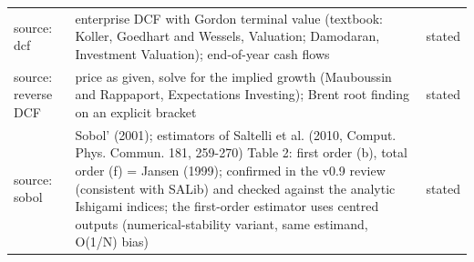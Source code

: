 \begin{table}[H]
\begin{tabular}{>{\raggedright\arraybackslash}p{3.0cm}>{\raggedright\arraybackslash}p{10.6cm}>{\raggedright\arraybackslash}p{2.1cm}}
source: dcf & enterprise DCF with Gordon terminal value (textbook: Koller, Goedhart and Wessels, Valuation; Damodaran, Investment Valuation); end-of-year cash flows & stated \\
source: reverse DCF & price as given, solve for the implied growth (Mauboussin and Rappaport, Expectations Investing); Brent root finding on an explicit bracket & stated \\
source: sobol & Sobol' (2001); estimators of Saltelli et al. (2010, Comput. Phys. Commun. 181, 259-270) Table 2: first order (b), total order (f) = Jansen (1999); confirmed in the v0.9 review (consistent with SALib) and checked against the analytic Ishigami indices; the first-order estimator uses centred outputs (numerical-stability variant, same estimand, O(1/N) bias) & stated \\
\bottomrule
\end{tabular}
\end{table}
